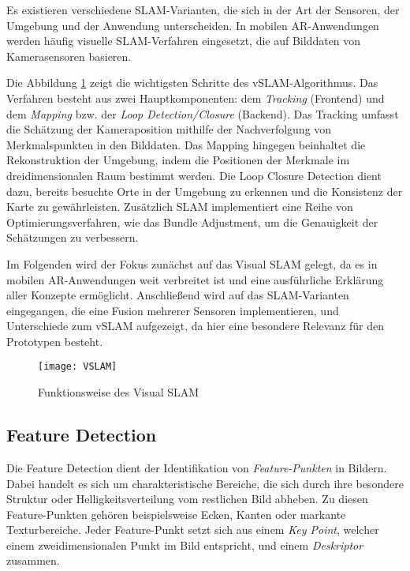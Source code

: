 Es existieren verschiedene SLAM-Varianten, die sich in der Art der Sensoren, der Umgebung und der Anwendung unterscheiden. In mobilen AR-Anwendungen werden häufig visuelle SLAM-Verfahren eingesetzt, die auf Bilddaten von Kamerasensoren basieren. \cite{tourani2022vSLAMTrends}

Die Abbildung \ref{fig:VSLAM} zeigt die wichtigsten Schritte des vSLAM-Algorithmus. Das Verfahren besteht aus zwei Hauptkomponenten: dem \emph{Tracking} (Frontend) und dem \emph{Mapping} bzw. der \emph{Loop Detection/Closure} (Backend). Das Tracking umfasst die Schätzung der Kameraposition mithilfe der Nachverfolgung von Merkmalspunkten in den Bilddaten. Das Mapping hingegen beinhaltet die Rekonstruktion der Umgebung, indem die Positionen der Merkmale im dreidimensionalen Raum bestimmt werden. Die Loop Closure Detection dient dazu, bereits besuchte Orte in der Umgebung zu erkennen und die Konsistenz der Karte zu gewährleisten. Zusätzlich SLAM implementiert eine Reihe von Optimierungsverfahren, wie das Bundle Adjustment, um die Genauigkeit der Schätzungen zu verbessern. \cite{gao2021vSLAM, tourani2022vSLAMTrends}

Im Folgenden wird der Fokus zunächst auf das Visual SLAM gelegt, da es in mobilen AR-Anwendungen weit verbreitet ist und eine ausführliche Erklärung aller Konzepte ermöglicht. Anschließend wird auf das SLAM-Varianten eingegangen, die eine Fusion mehrerer Sensoren implementieren, und Unterschiede zum vSLAM aufgezeigt, da hier eine besondere Relevanz für den Prototypen besteht. \cite{gao2021vSLAM, tourani2022vSLAMTrends, doerner2022virtual}

\begin{figure}
    \centering
    \texttt{[image: VSLAM]}
    \caption{Funktionsweise des Visual SLAM \cite{tourani2022vSLAMTrends}\label{fig:VSLAM}}\par
\end{figure}

\subsection{Feature Detection}

Die Feature Detection dient der Identifikation von \emph{Feature-Punkten} in Bildern. Dabei handelt es sich um charakteristische Bereiche, die sich durch ihre besondere Struktur oder Helligkeitsverteilung vom restlichen Bild abheben. Zu diesen Feature-Punkten gehören beispielsweise Ecken, Kanten oder markante Texturbereiche. Jeder Feature-Punkt setzt sich aus einem \emph{Key Point}, welcher einem zweidimensionalen Punkt im Bild entspricht, und einem \emph{Deskriptor} zusammen. \cite{gao2021vSLAM, szeliski2022computerVision}


